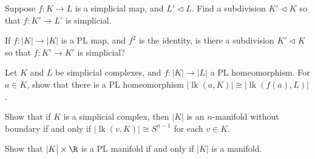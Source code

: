 \documentclass[12pt]{pset}
\newcommand{\subdivided}{\triangleleft}
\DeclareMathOperator{\lk}{lk}
\begin{document}
\begin{problem}
  Suppose $f : K \to L$ is a simplicial map, and $L' \subdivided L$.
  Find a subdivision $K' \subdivided K$ so that $f : K' \to L'$ is
  simplicial.
\end{problem}

\begin{problem}
  If $f : |K| \to |K|$ is a PL map, and $f^2$ is the identity, is
  there a subdivision $K' \subdivided K$ so that $f : K' \to K'$ is
  simplicial?
\end{problem}

\begin{problem}
  Let $K$ and $L$ be simplicial complexes, and $f : |K| \to |L|$ a PL
  homeomorphism.  For $a \in K$, show that there is a PL homeomorphism
  $|\lk(a,K)| \cong |\lk(f(a),L)|$.
\end{problem}

\begin{problem}
  Show that if $K$ is a simplicial complex, then $|K|$ is an
  $n$-manifold without boundary if and only if $|\lk(v,K)| \cong
  S^{n-1}$ for each $v \in K$.
\end{problem}

\begin{problem}
  Show that $|K| \times \R$ is a PL manifold if and only if $|K|$ is a manifold.
\end{problem}
\end{document}
